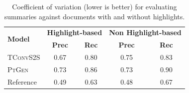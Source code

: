 \documentclass[11pt,a4paper]{article}
\newcommand\ptgen{\textsc{PtGen}}
\newcommand\tconv{\textsc{TConvS2S}}
\begin{document}
\begin{table}[ht!]
\small
\begin{tabular}{l|cc|cc}
\hline
\multirow{2}{*}{\textbf{Model}} & 
\multicolumn{2}{c|}{\textbf{Highlight-based}} & 
\multicolumn{2}{c}{\textbf{Non Highlight-based}} \\
&\textbf{Prec} & \textbf{Rec} & 
 \textbf{Prec} & \textbf{Rec} \\ \hline
\tconv{} & 0.67 & 0.80 & 0.75                             & 0.83  \\
\ptgen{} & 0.73 & 0.86 & 0.73   & 0.90  \\
Reference                             & 0.49                           & 0.63 & 0.48   & 0.67 \\
\hline

\end{tabular}
\caption{Coefficient of variation (lower is better) for evaluating summaries against documents with and without highlights.}
\label{table:summresultcv}
\end{table}

\end{document}
